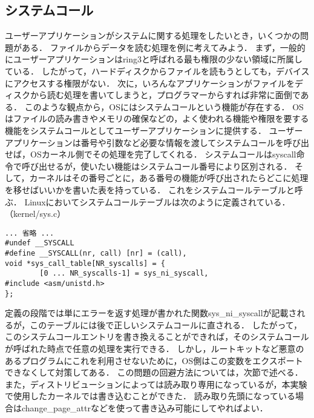 \documentclass{jsarticle}
\begin{document}
  \subsection{システムコール}
  ユーザーアプリケーションがシステムに関する処理をしたいとき，いくつかの問題がある．
  ファイルからデータを読む処理を例に考えてみよう．
  まず，一般的にユーザーアプリケーションはring3と呼ばれる最も権限の少ない領域に所属している．
  したがって，ハードディスクからファイルを読もうとしても，デバイスにアクセスする権限がない．
  次に，いろんなアプリケーションがファイルをディスクから読む処理を書いてしまうと，プログラマーからすれば非常に面倒である．
  このような観点から，OSにはシステムコールという機能が存在する．
  OSはファイルの読み書きやメモリの確保などの，よく使われる機能や権限を要する機能をシステムコールとしてユーザーアプリケーションに提供する．
  ユーザーアプリケーションは番号や引数など必要な情報を渡してシステムコールを呼び出せば，OSカーネル側でその処理を完了してくれる．
  システムコールはsyscall命令で呼び出せるが，使いたい機能はシステムコール番号により区別される．
  そして，カーネルはその番号ごとに，ある番号の機能が呼び出されたらどこに処理を移せばいいかを書いた表を持っている．
  これをシステムコールテーブルと呼ぶ．
  Linuxにおいてシステムコールテーブルは次のように定義されている．（kernel/sys.c）
  \\
  \begin{lstlisting}[basicstyle=\ttfamily\footnotesize, frame=single]
... 省略 ...
#undef __SYSCALL
#define __SYSCALL(nr, call) [nr] = (call),
void *sys_call_table[NR_syscalls] = {
        [0 ... NR_syscalls-1] = sys_ni_syscall,
#include <asm/unistd.h>
};
  \end{lstlisting}
  定義の段階では単にエラーを返す処理が書かれた関数sys\_ni\_syscallが記載されるが，このテーブルには後で正しいシステムコールに直される．
  したがって，このシステムコールエントリを書き換えることができれば，そのシステムコールが呼ばれた時点で任意の処理を実行できる．
  しかし，ルートキットなど悪意のあるプログラムにこれを利用させないために，OS側はこの変数をエクスポートできなくして対策してある．
  この問題の回避方法については，次節で述べる．
  また，ディストリビューションによっては読み取り専用になっているが，本実験で使用したカーネルでは書き込むことができた．
  読み取り先頭になっている場合はchange\_page\_attrなどを使って書き込み可能にしてやればよい．
\end{document}
